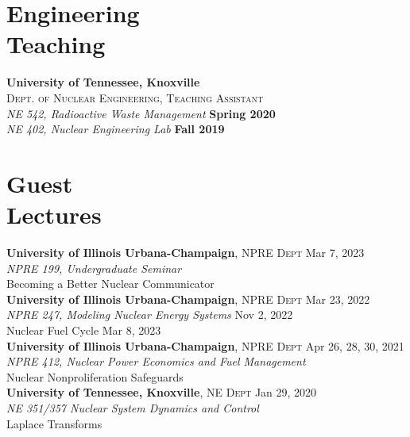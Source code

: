 \documentclass[margin,line]{resume}
\begin{document}
\begin{resume}
    \section{\mysidestyle Engineering\\Teaching}
    \textbf{University of Tennessee, Knoxville}\\
    \textsc{Dept. of Nuclear Engineering, Teaching Assistant}\\
               \textsl{NE 542, Radioactive Waste Management} \hfill \textbf{Spring 2020}\\
               \textsl{NE 402, Nuclear Engineering Lab} \hfill \textbf{Fall 2019}
               \vspace{2mm}

    \section{\mysidestyle Guest\\Lectures}
    \textbf{University of Illinois Urbana-Champaign}, \textsc{NPRE Dept} \hfill Mar 7, 2023\\
    \textsl{NPRE 199, Undergraduate Seminar} \\
    Becoming a Better Nuclear Communicator \vspace{1.5mm}\\    
    \textbf{University of Illinois Urbana-Champaign}, \textsc{NPRE Dept} \hfill Mar 23, 2022\\
    \textsl{NPRE 247, Modeling Nuclear Energy Systems} \hfill Nov 2, 2022\\
        Nuclear Fuel Cycle \hfill Mar 8, 2023 \vspace{1.5mm}\\
    \textbf{University of Illinois Urbana-Champaign}, \textsc{NPRE Dept} \hfill Apr 26, 28, 30, 2021\\
    \textsl{NPRE 412, Nuclear Power Economics and Fuel Management} \\
        Nuclear Nonproliferation Safeguards \vspace{1.5mm}\\
    \textbf{University of Tennessee, Knoxville}, \textsc{NE Dept} \hfill Jan 29, 2020\\
    \textsl{NE 351/357 Nuclear System Dynamics and Control} \\
        Laplace Transforms

\end{resume}
\end{document}

